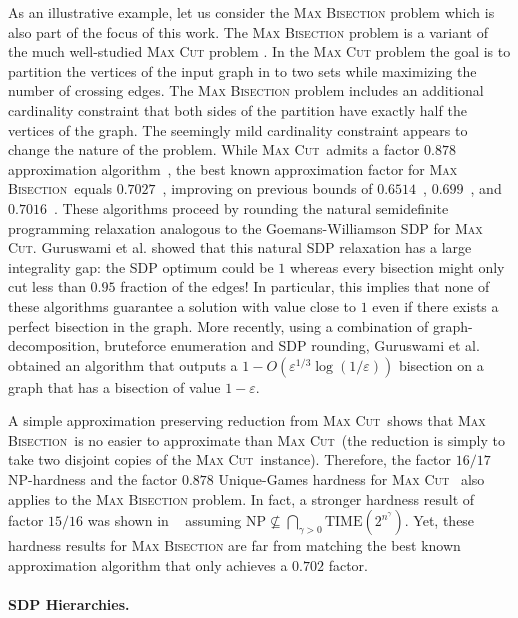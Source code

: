 \documentclass[11pt]{article}
\theoremstyle{definition}
\newcommand{\etal}{et al.\xspace}
\newcommand{\problemmacro}[1]{\texorpdfstring{\textsc{#1}}{#1}\xspace}
\newcommand{\maxcut}{\problemmacro{Max Cut}}
\newcommand{\maxbisection}{\problemmacro{Max Bisection}}
\let\epsilon=\varepsilon
\numberwithin{equation}{section}
\let\origparagraph\paragraph
\renewcommand{\paragraph}[1]{\origparagraph{#1.}}
\begin{document}
As an illustrative example, let us consider the \maxbisection problem
which is also part of the focus of this work.  The \maxbisection problem is
a variant of the much well-studied \maxcut problem
\cite{GoemansW95,KhotKMO07}.  In the \maxcut
problem the goal is to partition the vertices of the input graph in to
two sets while maximizing the number of crossing edges.  The
\maxbisection problem includes an additional cardinality constraint
that both sides of the partition have exactly half the vertices of the
graph.
The seemingly mild cardinality constraint appears to change the nature
of the problem.  While \maxcut\ admits a factor $0.878$ approximation
algorithm~\cite{GoemansW95}, the best known
approximation factor for \maxbisection\ equals
$0.7027$~\cite{FeigeL06}, improving on previous bounds of
$0.6514$~\cite{FriezeJ97}, $0.699$~\cite{Ye01}, and
$0.7016$~\cite{HalperinZ02}. These algorithms proceed by rounding
the natural semidefinite programming relaxation analogous to the
Goemans-Williamson SDP for \maxcut.  Guruswami \etal
\cite{GuruswamiMRSZ11} showed that this natural SDP relaxation has a large integrality gap: the SDP
optimum could be $1$ whereas every bisection might only cut less than
$0.95$ fraction of the edges!  In particular, this implies that none
of these algorithms guarantee a solution with value close to $1$ even
if there exists a perfect bisection in the graph.  More recently,
using a combination of graph-decomposition, bruteforce enumeration and
SDP rounding, Guruswami \etal \cite{GuruswamiMRSZ11} obtained an algorithm that
outputs a $1-O(\epsilon^{1/3}\log(1/\epsilon))$ bisection on a graph that has a
bisection of value $1-\epsilon$.

A simple approximation preserving
reduction from \maxcut\ shows that \maxbisection\ is no easier to
approximate than \maxcut\ (the reduction is simply to take two
disjoint copies of the \maxcut\ instance). Therefore, the factor
$16/17$ NP-hardness \cite{Hastad01,TrevisanSSW00} and the factor $0.878$ Unique-Games
hardness for \maxcut~\cite{KhotKMO07} also applies to the
\maxbisection problem.  In fact, a stronger hardness result of factor $15/16$
was shown in ~\cite{HolmerinK04} assuming $\mathrm{NP} \not\subseteq
\bigcap_{\gamma > 0}
\mathrm{TIME}(2^{n^\gamma})$.
Yet, these hardness results for \maxbisection are far from matching the
best known approximation algorithm that only achieves a $0.702$ factor.

\paragraph{SDP Hierarchies}
\end{document}
